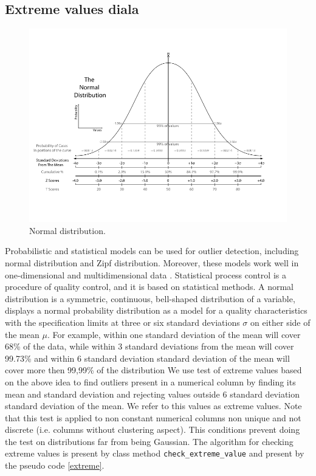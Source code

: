 \documentclass{article}
\begin{document}
\subsection{Extreme values diala} %
\label{sub:Extreme values}
\begin{figure}[H]
    \centering
    \includegraphics[width=0.8\linewidth]{picture/normal.png}
    \caption{Normal distribution.}
    \label{fig:normal}
\end{figure}
Probabilistic and statistical models can be used for outlier detection, including normal distribution and Zipf distribution. Moreover, these models work well in one-dimensional and
multidimensional data \cite{dai_yosh_pars}.
Statistical process control is a procedure of quality control, and it is based on statistical methods.
A normal distribution is a symmetric, continuous, bell-shaped distribution of a variable, displays a normal probability distribution as a model for a quality characteristics with the specification limits at three or six standard deviations $\sigma$ on either side of the mean $\mu$.
For example, within one standard deviation of the mean will cover 68\% of the data, while within 3 standard deviations from the mean will cover 99.73\% and within 6 standard deviation standard deviation of the mean will cover more then 99,99\% of the distribution
We use test of extreme values based on the above idea to find outliers present in a numerical column by finding its mean and standard deviation and rejecting values outside 6 standard deviation standard deviation of the mean.
We refer to this values as extreme values. Note that this test is applied to non constant numerical columns non unique and not discrete (i.e. columns without clustering aspect). This conditions prevent doing the test on distributions far from being Gaussian.
The algorithm for checking extreme values is present by class method \texttt{check\_extreme\_value}  and present by the pseudo code \ref{extreme}.
\end{document}
